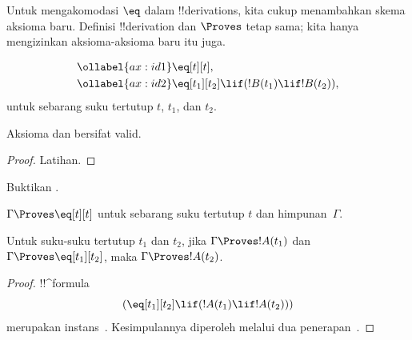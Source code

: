 \documentclass[../../../include/open-logic-section]{subfiles}
\begin{document}


Untuk mengakomodasi $\eq$ dalam !!{derivation}s, kita cukup menambahkan
skema aksioma baru. Definisi !!{derivation} dan $\Proves$ tetap sama;
kita hanya mengizinkan aksioma-aksioma baru itu juga.

\begin{defn}
\begin{align}
\ollabel{ax:id1} & \eq[t][t], \\
\ollabel{ax:id2} & \eq[t_1][t_2] \lif (!B(t_1) \lif
  !B(t_2)),
\end{align}
untuk sebarang suku tertutup $t$, $t_1$, dan $t_2$.
\end{defn}

\begin{prop}
  Aksioma  dan  bersifat valid.
\end{prop}

\begin{proof}
  Latihan.
\end{proof}

\begin{prob}
Buktikan .
\end{prob}

\begin{prop}
 $\Gamma \Proves \eq[t][t]$ untuk sebarang suku tertutup $t$ dan
 himpunan~$\Gamma$.
\end{prop}

\begin{prop}
  Untuk suku-suku tertutup $t_1$ dan $t_2$, jika
  $\Gamma \Proves !A(t_1)$ dan $\Gamma \Proves
  \eq[t_1][t_2]$, maka $\Gamma \Proves !A(t_2)$.
\end{prop}

\begin{proof}
!!^{formula}
\[
(\eq[t_1][t_2] \lif (!A(t_1) \lif !A(t_2)))
\]
merupakan instans~. Kesimpulannya diperoleh melalui dua
penerapan~\MP.
\end{proof}
\end{document}
